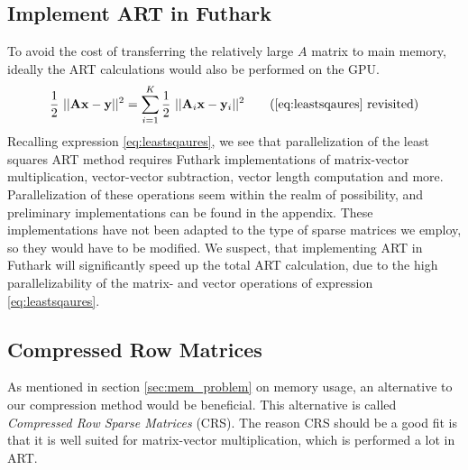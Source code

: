 \subsection{Implement ART in Futhark}
To avoid the cost of transferring the relatively large $A$ matrix to main memory, ideally the ART calculations would also be performed on the GPU. 
\begin{equation}
    \frac{1}{2} ~ || \mathbf{Ax} - \mathbf{y} ||^{2} = \sum_{i=1}^K \frac{1}{2} ~ || \mathbf{A}_i\mathbf{x} - \mathbf{y}_i ||^{2}\tag{\eqref{eq:leastsqaures} revisited}
\end{equation}
Recalling expression \eqref{eq:leastsqaures}, we see that parallelization of the least squares ART method requires Futhark implementations of matrix-vector multiplication, vector-vector subtraction, vector length computation and more. Parallelization of these operations seem within the realm of possibility, and preliminary implementations can be found in the appendix. These implementations have not been adapted to the type of sparse matrices we employ, so they would have to be modified. We suspect, that implementing ART in Futhark will significantly speed up the total ART calculation, due to the high parallelizability of the matrix- and vector operations of expression \eqref{eq:leastsqaures}. 

\subsection{Compressed Row Matrices}
\label{sec:CRS}
As mentioned in section \ref{sec:mem_problem} on memory usage, an alternative to our compression method would be beneficial. This alternative is called \emph{Compressed Row Sparse Matrices} (CRS).
The reason CRS should be a good fit is that it is well suited for matrix-vector multiplication, which is performed a lot in ART\cite{SCIPY_CRS}. 


